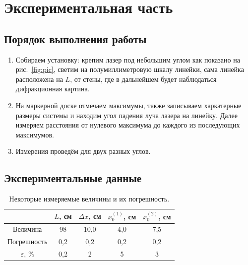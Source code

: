 \documentclass[a4paper,12pt]{article} %
\begin{document}
\section{Экспериментальная часть}
	\subsection{Порядок выполнения работы}
		\begin{enumerate}
			\item
				Собираем установку: крепим лазер под небольшим углом как показано на рис.~\ref{fig:pic}, светим на полумиллиметровую шкалу линейки, сама линейка расположена на $L$, от стены, где в дальнейшем будет наблюдаться дифракционная картина.
			\item 
				На маркерной доске отмечаем максимумы, также записываем харкатерные размеры системы и находим угол падения луча лазера на линейку. Далее измеряем расстояния от нулевого максимума до каждого из последующих максимумов.
			\item 
				Измерения проведём для двух разных углов.
		\end{enumerate}
	
	\subsection{Экспериментальные данные}
		\begin{table}[H]
			\caption{Некоторые измеряемые величины и их погрешность.}
			\label{table:parametr}
			\begin{tabular}{|c|c|c|c|c|}
				\hline
				& $L$, см & $\Delta x$, см & $x_0^{(1)}$, см & $x_0^{(2)}$, см \\ \hline
				Величина          & 98      & 10,0           & 4,0             & 7,5             \\ \hline
				Погрешность       & 0,2     & 0,2            & 0,2             & 0,2             \\ \hline
				$\varepsilon$, \% & 0,2     & 2              & 5               & 3             \\ \hline
			\end{tabular}
		\end{table}
	
\end{document}
